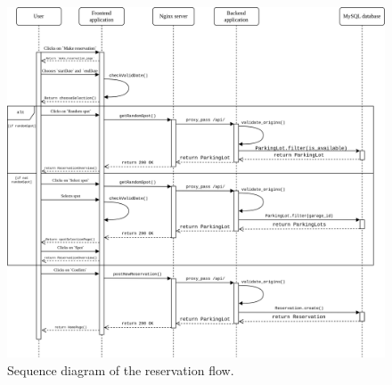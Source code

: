 \begin{appendices}
\begin{figure}
    \centering
    \includegraphics[width=16cm]{images/sequence_diagram_reservation.drawio.png}
    \caption{Sequence diagram of the reservation flow.}
    \label{fig:sequence-diagram-reservation}
\end{figure}

\end{appendices}
